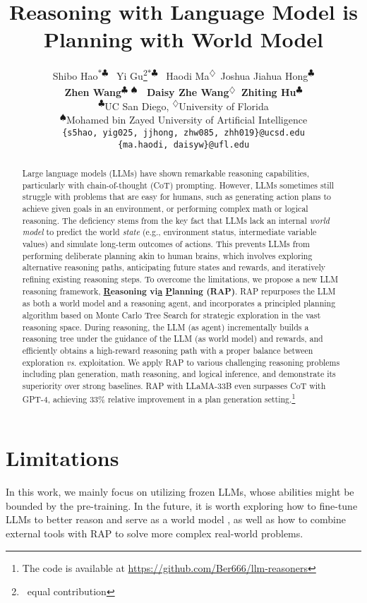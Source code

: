 \documentclass[11pt]{article}
\title{Reasoning with Language Model is
Planning with World Model}
\author{%
Shibo Hao\textsuperscript{$*\clubsuit$} \ Yi Gu\thanks{\, equal contribution}\textsuperscript{$*\clubsuit$} \
Haodi Ma\textsuperscript{$\diamondsuit$}\  Joshua Jiahua Hong\textsuperscript{$\clubsuit$} \\ \textbf{Zhen Wang\textsuperscript{$\clubsuit$ $\spadesuit$} \
Daisy Zhe Wang\textsuperscript{$\diamondsuit$}\ Zhiting Hu\textsuperscript{$\clubsuit$}}  \vspace{5pt} \\
\textsuperscript{$\clubsuit$}UC San Diego, \textsuperscript{$\diamondsuit$}University of Florida\\
\textsuperscript{$\spadesuit$}Mohamed bin Zayed University of Artificial Intelligence \\
\texttt{\{s5hao, yig025, jjhong, zhw085, zhh019\}@ucsd.edu}  \\
\texttt{\{ma.haodi, daisyw\}@ufl.edu}}
\begin{document}
\maketitle
\begin{abstract}
Large language models (LLMs) have shown remarkable reasoning capabilities, particularly with chain-of-thought (CoT) prompting. However, LLMs sometimes still struggle with problems that are easy for humans, such as generating action plans to achieve given goals in an environment, or performing complex math or logical reasoning. The deficiency stems from the key fact that LLMs lack an internal \emph{world model} to predict the world \emph{state} (e.g., environment status, intermediate variable values) and simulate long-term outcomes of actions. This prevents LLMs from performing deliberate planning akin to human brains, which involves exploring alternative reasoning paths, anticipating future states and rewards, and iteratively refining existing reasoning steps. To overcome the limitations, we propose a new LLM reasoning framework, {\bf \underline{R}easoning vi\underline{a} \underline{P}lanning (RAP)}. RAP repurposes the LLM as both a world model and a reasoning agent, and incorporates a principled planning algorithm based on Monte Carlo Tree Search for strategic exploration in the vast reasoning space. During reasoning, the LLM (as agent) incrementally builds a reasoning tree under the guidance of the LLM (as world model) and rewards, and efficiently obtains a high-reward reasoning path with a proper balance between exploration \emph{vs.} exploitation.
We apply RAP to various challenging reasoning problems including plan generation, math reasoning, and logical inference, and demonstrate its superiority over strong baselines. RAP with LLaMA-33B even surpasses CoT with GPT-4, achieving 33\% relative improvement in a plan generation setting.\footnote{The code is available at \url{https://github.com/Ber666/llm-reasoners}}
\end{abstract}





\section*{Limitations}
In this work, we mainly focus on utilizing frozen LLMs, whose abilities might be bounded by the pre-training. In the future, it is worth exploring how to fine-tune LLMs to better reason and serve as a world model \cite{xiang2023language}, as well as how to combine external tools \cite{hao2023toolkengpt,schick2023toolformer} with RAP to solve more complex real-world problems.
\end{document}
